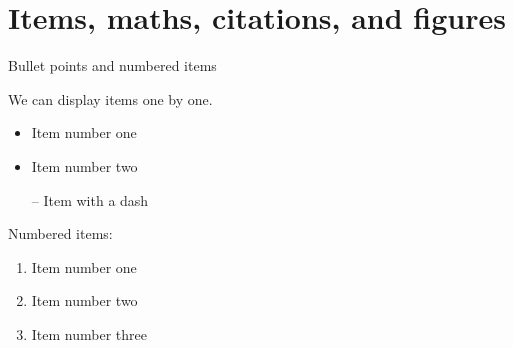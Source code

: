 \documentclass[12pt]{beamer}
\begin{document}
{
}



\section{Items, maths, citations, and figures}

\begin{frame}{Bullet points and numbered items}

We can display items \alert{one by one}.

\pause

\begin{itemize}[<+->]
    \item Item \alert<2>{number one}
    \item Item \alert<3>{number two}
    \item[--] Item with a \alert<4>{dash}
\end{itemize}

\pause
Numbered items:

\begin{enumerate}[<+->]
    \item Item \alert<6>{number one}
    \item Item \alert<7>{number two}
    \item Item \alert<8>{number three}
\end{enumerate}
\end{frame}
\end{document}
